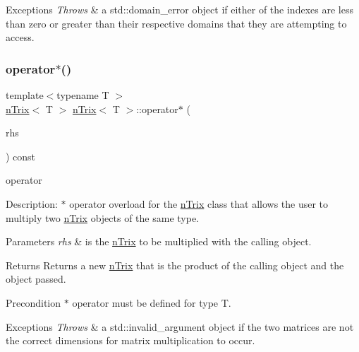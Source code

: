 \begin{DoxyExceptions}{Exceptions}
{\em Throws} & a std\+::domain\+\_\+error object if either of the indexes are less than zero or greater than their respective domains that they are attempting to access. \\
\hline
\end{DoxyExceptions}
\mbox{\label{classnTrix_ad04ab9579b2941f7be4b0402085fd40f}} 
\subsubsection{\texorpdfstring{operator$\ast$()}{operator*()}\hspace{0.1cm}{\footnotesize\ttfamily [1/2]}}
{\footnotesize\ttfamily template$<$typename T $>$ \\
\hyperlink{classnTrix}{n\+Trix}$<$ T $>$ \hyperlink{classnTrix}{n\+Trix}$<$ T $>$\+::operator$\ast$ (\begin{DoxyParamCaption}\item[{const \hyperlink{classnTrix}{n\+Trix}$<$ T $>$ \&}]{rhs }\end{DoxyParamCaption}) const}




\begin{DoxyItemize}
\item operator 
\end{DoxyItemize}

Description\+: $\ast$ operator overload for the \hyperlink{classnTrix}{n\+Trix} class that allows the user to multiply two \hyperlink{classnTrix}{n\+Trix} objects of the same type. 
\begin{DoxyParams}{Parameters}
{\em rhs} & is the \hyperlink{classnTrix}{n\+Trix} to be multiplied with the calling object. \\
\hline
\end{DoxyParams}
\begin{DoxyReturn}{Returns}
Returns a new \hyperlink{classnTrix}{n\+Trix} that is the product of the calling object and the object passed. 
\end{DoxyReturn}
\begin{DoxyPrecond}{Precondition}
$\ast$ operator must be defined for type T. 
\end{DoxyPrecond}

\begin{DoxyExceptions}{Exceptions}
{\em Throws} & a std\+::invalid\+\_\+argument object if the two matrices are not the correct dimensions for matrix multiplication to occur. \\
\hline
\end{DoxyExceptions}
\mbox{\label{classnTrix_a6e3a9b2026a59a6822b060abf6d97425}} 
